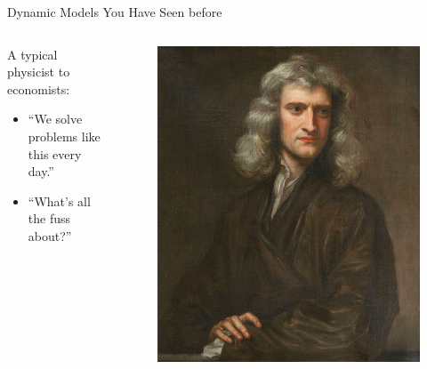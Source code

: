 \documentclass[aspectratio=169,10pt]{beamer}
\begin{document}
	
\begin{frame}{Dynamic Models You Have Seen before}
	\begin{columns}
		\begin{column}{0.4\textwidth}
		A typical physicist to economists:
		\vspace{0.025in}
		\begin{itemize}
			\item “We solve problems like this every day.”
			\vspace{0.025in}
			\item “What’s all the fuss about?”
		\end{itemize}
		\end{column}
		\begin{column}{0.4\textwidth}
			\begin{figure}[t!]
				\centering
				\includegraphics[width=\textwidth]{figs/newton}
				\vspace{-7mm}
			\end{figure}
		\end{column}
	\end{columns}
\end{frame}
\end{document}

